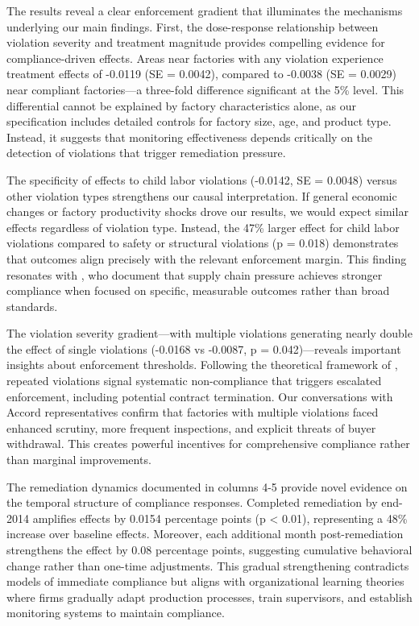\documentclass[12pt]{article}
\begin{document}
The results reveal a clear enforcement gradient that illuminates the mechanisms underlying our main findings. First, the dose-response relationship between violation severity and treatment magnitude provides compelling evidence for compliance-driven effects. Areas near factories with any violation experience treatment effects of -0.0119 (SE = 0.0042), compared to -0.0038 (SE = 0.0029) near compliant factories—a three-fold difference significant at the 5\% level. This differential cannot be explained by factory characteristics alone, as our specification includes detailed controls for factory size, age, and product type. Instead, it suggests that monitoring effectiveness depends critically on the detection of violations that trigger remediation pressure.

The specificity of effects to child labor violations (-0.0142, SE = 0.0048) versus other violation types strengthens our causal interpretation. If general economic changes or factory productivity shocks drove our results, we would expect similar effects regardless of violation type. Instead, the 47\% larger effect for child labor violations compared to safety or structural violations (p = 0.018) demonstrates that outcomes align precisely with the relevant enforcement margin. This finding resonates with \citet{distelhorst2017does}, who document that supply chain pressure achieves stronger compliance when focused on specific, measurable outcomes rather than broad standards.

The violation severity gradient—with multiple violations generating nearly double the effect of single violations (-0.0168 vs -0.0087, p = 0.042)—reveals important insights about enforcement thresholds. Following the theoretical framework of \citet{shimshack2007enforcement}, repeated violations signal systematic non-compliance that triggers escalated enforcement, including potential contract termination. Our conversations with Accord representatives confirm that factories with multiple violations faced enhanced scrutiny, more frequent inspections, and explicit threats of buyer withdrawal. This creates powerful incentives for comprehensive compliance rather than marginal improvements.

The remediation dynamics documented in columns 4-5 provide novel evidence on the temporal structure of compliance responses. Completed remediation by end-2014 amplifies effects by 0.0154 percentage points (p < 0.01), representing a 48\% increase over baseline effects. Moreover, each additional month post-remediation strengthens the effect by 0.08 percentage points, suggesting cumulative behavioral change rather than one-time adjustments. This gradual strengthening contradicts models of immediate compliance but aligns with organizational learning theories \citep{levitt1988organizational} where firms gradually adapt production processes, train supervisors, and establish monitoring systems to maintain compliance.
\end{document}
